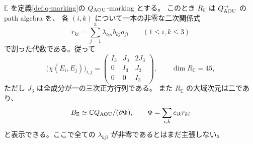 \begin{proposition}
\label{prop:aou-quiver-euler-recognition}
$\mathbb E$ を定義\ref{def:q-marking}の $Q_{\rm AOU}$-marking とする。
このとき $R_{\mathbb E}$ は $Q_{\rm AOU}^{\to}$ の path algebra を、
各 $(i,k)$ について一本の非零な二次関係式
\begin{equation}\label{eq:aou-q-relations}
 r_{ki}=\sum_{j=1}^3\lambda_{kji}b_{kj}a_{ji}
 \qquad(1\le i,k\le3)
\end{equation}
で割った代数である。従って
\begin{equation}\label{eq:aou-q-euler}
 \bigl(\chi(E_i,E_j)\bigr)_{i,j}
 =\begin{pmatrix}
 I_3&J_3&2J_3\\
 0&I_3&J_3\\
 0&0&I_3
 \end{pmatrix},\qquad \dim R_{\mathbb E}=45,
\end{equation}
ただし $J_3$ は全成分が一の三次正方行列である。
また $R_{\mathbb E}$ の大域次元は二であり、
\[
 B_{\mathbb E}\simeq
 \mathbb C Q_{\rm AOU}/(\partial\Phi),\qquad
 \Phi=\sum_{i,k}c_{ik}r_{ki}
\]
と表示できる。ここで全ての $\lambda_{kji}$ が非零であるとはまだ主張しない。
\end{proposition}
